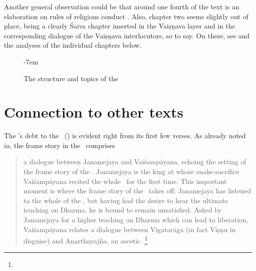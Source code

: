 Another general observation
could be that around one fourth of the text is
an elaboration on rules of religious conduct 
. Also, chapter two seems slightly
out of place, being a clearly Śaiva chapter inserted
in the Vaiṣṇava layer and in the corresponding 
dialogue of the Vai\-ṣṇa\-va interlocutors, so to say.
On these, see 
and the analyses of the individual chapters below.





\begin{figure}[!]

\begin{center}
\thispagestyle{empty}
\vspace{0em}
\leftskip-7em
\end{center}

\caption[Structure and topics of the \VSS]{The structure and topics of the \VSS\ 
   \label{fig:structlotus}}
   
\end{figure}



\section{Connection to other texts}
\label{vss_connection_other_texts}

The \VSS's debt to the \MBh\ (\MBH) is evident right
from its first few verses. As already noted in, 
the frame story in the \VSS\  comprises

\begin{quote}
a dialogue between Janamejaya and Vaiśampāyana, 
echoing the setting of the frame story of the \MBh. 
Janamejaya is the king at whose snake-sacrifice 
Vaiśampāyana recited the whole \MBh\ for the first
time. This important moment is where the frame story 
of the \Vss\ takes off: Janamejaya has 
listened to the whole of the \MBh,
but having had the desire to hear the ultimate 
teaching on Dharma, he is bound to remain unsatisfied.
 Asked by Janamejaya for a higher teaching
on Dharma which can lead to liberation, 
Vaiśampāyana relates a dialogue between Vigatarāga 
(in fact Viṣṇu in disguise) and Anarthayajña, an ascet­ic.%
				\footnote{}
\end{quote}
 
